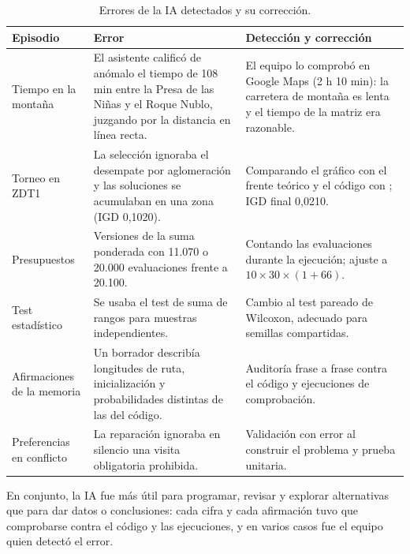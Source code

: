 \begin{table}[H]
\centering
\small
\caption{Errores de la IA detectados y su corrección.}
\label{tab:ia_errores}
\begin{tabularx}{\textwidth}{@{}l X X@{}}
\toprule
Episodio & Error & Detección y corrección \\
\midrule
Tiempo en la montaña & El asistente calificó de anómalo el tiempo de 108 min entre la Presa de las Niñas y el Roque Nublo, juzgando por la distancia en línea recta. & El equipo lo comprobó en Google Maps (2 h 10 min): la carretera de montaña es lenta y el tiempo de la matriz era razonable. \\
Torneo en ZDT1 & La selección ignoraba el desempate por aglomeración y las soluciones se acumulaban en una zona (IGD 0,1020). & Comparando el gráfico con el frente teórico y el código con \citet{deb2002}; IGD final 0,0210. \\
Presupuestos & Versiones de la suma ponderada con 11.070 o 20.000 evaluaciones frente a 20.100. & Contando las evaluaciones durante la ejecución; ajuste a $10 \times 30 \times (1+66)$. \\
Test estadístico & Se usaba el test de suma de rangos para muestras independientes. & Cambio al test pareado de Wilcoxon, adecuado para semillas compartidas. \\
Afirmaciones de la memoria & Un borrador describía longitudes de ruta, inicialización y probabilidades distintas de las del código. & Auditoría frase a frase contra el código y ejecuciones de comprobación. \\
Preferencias en conflicto & La reparación ignoraba en silencio una visita obligatoria prohibida. & Validación con error al construir el problema y prueba unitaria. \\
\bottomrule
\end{tabularx}
\end{table}

En conjunto, la IA fue más útil para programar, revisar y explorar alternativas que para dar datos o conclusiones: cada cifra y cada afirmación tuvo que comprobarse contra el código y las ejecuciones, y en varios casos fue el equipo quien detectó el error.
